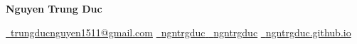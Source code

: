 \documentclass[letterpaper,11pt]{article}
\begin{document}
\begin{center}
    {\Huge \textbf{Nguyen Trung Duc}} \\
    \vspace{0.7em}

    \href{mailto:trungducnguyen1511@gmail.com}{\faEnvelope\ {trungducnguyen1511@gmail.com}} \quad 
    \href{https://www.linkedin.com/in/ngntrgduc/}{\faLinkedin\ {ngntrgduc}
    } \quad
    \href{https://github.com/ngntrgduc}{\faGithub\ {ngntrgduc}} \quad
    \href{https://ngntrgduc.github.io/}{\faHome\ {ngntrgduc.github.io}} 
\end{center}

\end{document}
